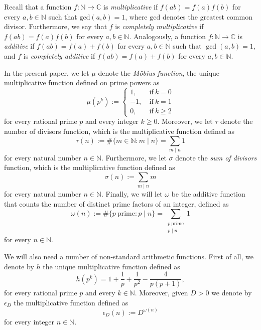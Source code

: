 \documentclass[10pt,a4paper]{amsart}
\theoremstyle{plain}
\theoremstyle{definition}
\theoremstyle{remark}
\begin{document}
Recall that a function $f \colon \mathbb{N} \to \mathbb{C}$ is \textit{multiplicative} if $f(ab) = f(a) f(b)$ for every $a,b \in \mathbb{N}$ such that $\mathrm{gcd}(a,b) = 1$, where $\mathrm{gcd}$ denotes the greatest common divisor. Furthermore, we say that $f$ is \textit{completely multiplicative} if $f(ab) = f(a) f(b)$ for every $a,b \in \mathbb{N}$. Analogously, a function $f \colon \mathbb{N} \to \mathbb{C}$ is \textit{additive} if $f(ab) = f(a) + f(b)$ for every $a,b \in \mathbb{N}$ such that $\gcd(a,b) = 1$, and $f$ is \textit{completely additive} if $f(ab) = f(a) + f(b)$ for every $a,b \in \mathbb{N}$.

In the present paper, we let $\mu$ denote the \textit{Möbius function}, the unique multiplicative function defined on prime powers as
\begin{equation} \label{eq:mobius}
    \mu(p^k) := \begin{cases}
        1, \ &\text{if} \ k = 0 \\
        -1, \ &\text{if} \ k = 1 \\
        0, \ &\text{if} \ k \geq 2
    \end{cases}
\end{equation}
for every rational prime $p$ and every integer $k \geq 0$. Moreover, we let $\tau$ denote the number of divisors function, which is the multiplicative function defined as
\begin{equation} \label{eq:tau}
    \tau(n) := \# \{ m \in \mathbb{N} \colon m \mid n \} = \sum_{m \mid n} 1
\end{equation}
for every natural number $n \in \mathbb{N}$. Furthermore, we let $\sigma$ denote the \textit{sum of divisors} function, which is the multiplicative function defined as
\begin{equation} \label{eq:sigma}
    \sigma(n) := \sum_{m \mid n} m
\end{equation}
for every natural number $n \in \mathbb{N}$. Finally, we will let $\omega$ be the additive function that counts the number of distinct prime factors of an integer, defined as
\[
    \omega(n) := \# \{p \ \text{prime} \colon p \mid n \} = \sum_{\substack{p \ \text{prime} \\ p \mid n}} 1 
\]
for every $n \in \mathbb{N}$.

We will also need a number of non-standard arithmetic functions. First of all, we denote by $h$ the unique multiplicative function defined as
\begin{equation} \label{eq:h}
h(p^k)=1+\frac{1}{p}+\frac{1}{p^2}-\frac{4}{p(p+1)},
\end{equation}
for every rational prime $p$ and every $k \in \mathbb{N}$. Moreover, given $D > 0$ we denote by $\epsilon_D$ the multiplicative function defined as 
\begin{equation}
    \label{eq:epsilon}
    \epsilon_D(n) := D^{\omega(n)}
\end{equation}
for every integer $n \in \mathbb{N}$.
\end{document}
